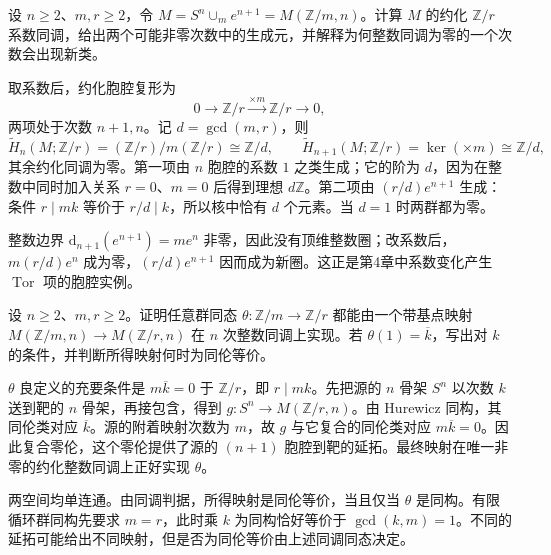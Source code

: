 \begin{exercise}\label{g2:ex:moore-coefficient-homology}
	设 \(n\ge2\)、\(m,r\ge2\)，令 \(M=S^n\cup_m e^{n+1}=M(\mathbb Z/m,n)\)。计算 \(M\) 的约化 \(\mathbb Z/r\) 系数同调，给出两个可能非零次数中的生成元，并解释为何整数同调为零的一个次数会出现新类。
\end{exercise}
\begin{solution}
	取系数后，约化胞腔复形为
	\[
		0\longrightarrow\mathbb Z/r\xrightarrow{\times m}\mathbb Z/r\longrightarrow0,
	\]
	两项处于次数 \(n+1,n\)。记 \(d=\gcd(m,r)\)，则
	\[
		\widetilde H_n(M;\mathbb Z/r)=(\mathbb Z/r)/m(\mathbb Z/r)\cong\mathbb Z/d,
		\qquad
		\widetilde H_{n+1}(M;\mathbb Z/r)=\ker(\times m)\cong\mathbb Z/d,
	\]
	其余约化同调为零。第一项由 \(n\) 胞腔的系数 \(1\) 之类生成；它的阶为 \(d\)，因为在整数中同时加入关系 \(r=0\)、\(m=0\) 后得到理想 \(d\mathbb Z\)。第二项由 \((r/d)e^{n+1}\) 生成：条件 \(r\mid mk\) 等价于 \(r/d\mid k\)，所以核中恰有 \(d\) 个元素。当 \(d=1\) 时两群都为零。

	整数边界 \(\mathrm d_{n+1}(e^{n+1})=me^n\) 非零，因此没有顶维整数圈；改系数后，\(m(r/d)e^n\) 成为零，\((r/d)e^{n+1}\) 因而成为新圈。这正是第4章中系数变化产生 \(\operatorname{Tor}\) 项的胞腔实例。
\end{solution}

\begin{exercise}\label{g2:ex:maps-cyclic-moore-spaces}
	设 \(n\ge2\)、\(m,r\ge2\)。证明任意群同态 \(\theta:\mathbb Z/m\to\mathbb Z/r\) 都能由一个带基点映射 \(M(\mathbb Z/m,n)\to M(\mathbb Z/r,n)\) 在 \(n\) 次整数同调上实现。若 \(\theta(1)=\overline k\)，写出对 \(k\) 的条件，并判断所得映射何时为同伦等价。
\end{exercise}
\begin{solution}
	\(\theta\) 良定义的充要条件是 \(m\overline k=0\) 于 \(\mathbb Z/r\)，即 \(r\mid mk\)。先把源的 \(n\) 骨架 \(S^n\) 以次数 \(k\) 送到靶的 \(n\) 骨架，再接包含，得到 \(g:S^n\to M(\mathbb Z/r,n)\)。由 Hurewicz 同构，其同伦类对应 \(\overline k\)。源的附着映射次数为 \(m\)，故 \(g\) 与它复合的同伦类对应 \(m\overline k=0\)。因此复合零伦，这个零伦提供了源的 \((n+1)\) 胞腔到靶的延拓。最终映射在唯一非零的约化整数同调上正好实现 \(\theta\)。

	两空间均单连通。由同调判据，所得映射是同伦等价，当且仅当 \(\theta\) 是同构。有限循环群同构先要求 \(m=r\)，此时乘 \(k\) 为同构恰好等价于 \(\gcd(k,m)=1\)。不同的延拓可能给出不同映射，但是否为同伦等价由上述同调同态决定。
\end{solution}

